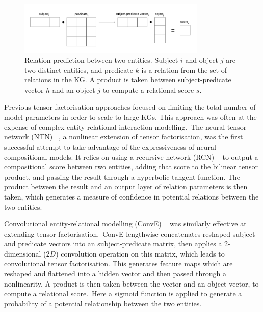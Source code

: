 \begin{figure}[H]
   	\centering
    	\includegraphics[width=0.8\textwidth, height=0.3\textwidth]{inference}
	\caption{Relation prediction between two entities. Subject $ i $ and object $ j $ are two distinct entities, and predicate $ k $ is a relation from the set of relations in the KG. A product is taken between subject-predicate vector $ h $ and an object $ j $ to compute a relational score $ s $.}
\end{figure}

\noindent Previous tensor factorisation approaches focused on limiting the total number of model parameters in order to scale to large KGs. This approach was often at the expense of complex entity-relational interaction modelling.\ The neural tensor network (NTN) \unskip~\citep{socher2013reasoning}, a nonlinear extension of tensor factorisation, was the first successful attempt to take advantage of the expressiveness of neural compositional models. It relies on using a recursive network (RCN) \unskip ~\citep{pollack1990recursive} to output a compositional score between two entities, adding that score to the bilinear tensor product, and passing the result through a hyperbolic tangent function. The product between the result and an output layer of relation parameters is then taken, which generates a measure of confidence in potential relations between the two entities.\par

\noindent Convolutional entity-relational modelling (ConvE) \unskip~\citep{dettmers2018convolutional} was similarly effective at extending tensor factorisation.\ ConvE lengthwise concatenates reshaped subject and predicate vectors into an subject-predicate matrix, then applies a 2-dimensional ($ 2D $) convolution operation on this matrix, which leads to convolutional tensor factorisation. This generates feature maps which are reshaped and flattened into a hidden vector and then passed through a nonlinearity. A product is then taken between the vector and an object vector, to compute a relational score.\ Here a sigmoid function is applied to generate a probability of a potential relationship between the two entities. \par 

